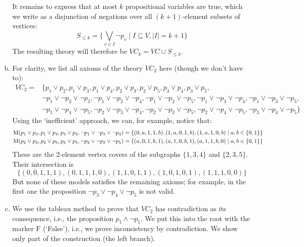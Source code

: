 \begin{problem}
\begin{solution}
\begin{enumerate}[(a)]
            It remains to express that at most $k$ propositional variables are true, which we write as a disjunction of negations over all $(k+1)$-element subsets of vertices:
            $$
            S_{\leq k}=\{\bigvee_{v\in I} \neg p_v\mid I\subseteq V,|I|=k+1\}
            $$
            The resulting theory will therefore be $VC_k=VC\cup S_{\leq k}$.
            \item For clarity, we list all axioms of the theory $VC_2$ here (though we don’t have to):
            \begin{align*}
                VC_2=&\{p_1\lor p_2,p_1\lor p_3,p_1\lor p_4,p_2\lor p_3,p_2\lor p_5,p_3\lor p_4,p_3\lor p_5,\\
                &\neg p_1\lor\neg p_2\lor\neg p_3,\neg p_1\lor\neg p_2\lor\neg p_4,
                \neg p_1\lor\neg p_2\lor\neg p_5,\neg p_1\lor\neg p_3\lor\neg p_4,
                \neg p_1\lor\neg p_3\lor\neg p_5,\\ &\neg p_1\lor\neg p_4\lor\neg p_5,
                \neg p_2\lor\neg p_3\lor\neg p_4,\neg p_2\lor\neg p_3\lor\neg p_5,
                \neg p_2\lor\neg p_4\lor\neg p_5,\neg p_3\lor\neg p_4\lor\neg p_5\}
            \end{align*}
            Using the ‘inefficient’ approach, we can, for example, notice that:
            \begin{align*}
                \operatorname{M}(p_1\lor p_3,p_1\lor p_4,p_3\lor p_4,\neg p_1\lor\neg p_3\lor\neg p_4)&=\{(0,a,1,1,b),(1,a,0,1,b),(1,a,1,0,b)\mid a,b\in\{0,1\}\}\\
                \operatorname{M}(p_2\lor p_3,p_2\lor p_5,p_3\lor p_5,\neg p_2\lor\neg p_3\lor\neg p_5)&=\{(a,0,1,b,1),(a,1,0,b,1),(a,1,1,b,0)\mid a,b\in\{0,1\}\}\\
            \end{align*}
            These are the 2-element vertex covers of the subgraphs $\{1,3,4\}$ and $\{2,3,5\}$. Their intersection is
            $$
                \{(0,0,1,1,1),(0,1,1,1,0),(1,1,0,1,1),(1,0,1,0,1),(1,1,1,0,0)\}
            $$
            But none of these models satisfies the remaining axioms; for example, in the first one the proposition $\neg p_3\lor\neg p_4\lor\neg p_5$ is not valid.
            \item We use the tableau method to prove that $VC_2$ has contradiction as its consequence, i.e., the proposition $p_1\land \neg p_1$. We put this into the root with the marker $\mathrm{F}$ (`False’), i.e., we prove inconsistency by contradiction. We show only part of the construction (the left branch).
           

\end{enumerate}
\end{solution}
\end{problem}
